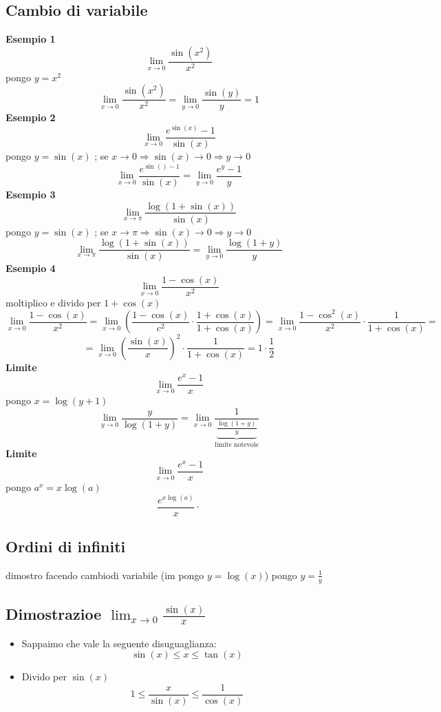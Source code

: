 \subsection{Cambio di variabile}
\textbf{Esempio 1} 
\[
\lim_{x \to 0} \frac{\sin\left( x^2 \right) }{x^2} 
\] 
pongo $y=x^2$ 
\[
\lim_{x \to 0} \frac{\sin\left( x^2 \right) }{x^2}= \lim_{y \to 0} \frac{\sin\left( y \right) }{y}= 1 
\] 
\textbf{Esempio 2}
\[
\lim_{x \to  0} \frac{e^{\sin\left( x \right) }-1}{\sin\left( x \right) } 
\] 
pongo $y=\sin\left( x \right) $ ; se $x \to 0 \Rightarrow \sin\left( x \right) \to 0 \Rightarrow y \to 0$ 
\[
\lim_{x \to 0} \frac{e^{\sin\left(  \right) -1}}{\sin\left( x \right) }= \lim_{y \to 0} \frac{e^{y}-1}{y}  
\] 
\textbf{Esempio 3}
\[
\lim_{x \to \pi } \frac{\log\left( 1+\sin\left( x \right)  \right) }{\sin\left( x \right) } 
\] 
pongo $y=\sin\left( x \right) $ ; se $x \to \pi \Rightarrow \sin\left( x \right) \to 0 \Rightarrow y \to 0$
\[
\lim_{x \to \pi } \frac{\log\left( 1+\sin\left( x \right)  \right) }{\sin\left( x \right) } = \lim_{y \to 0} \frac{\log \left( 1+y \right) }{y} 
\] 
\textbf{Esempio 4}
\[
\lim_{x \to 0} \frac{1-\cos\left( x \right) }{x^2} 
\]
moltiplico e divido per $1+\cos\left( x \right) $ 
\[
\lim_{x \to 0} \frac{1-\cos\left( x \right) }{x^2} = \lim_{x \to 0} \left(\frac{1-\cos\left( x \right) }{c^2} \cdot \frac{1+ \cos \left( x \right) }{1 + \cos \left( x \right) } \right) = \lim_{x \to 0} \frac{1-\cos ^2 \left( x \right) }{x^2} \cdot \frac{1}{1+\cos\left( x \right) }  = 
\]
\[
=\lim_{x \to 0} \left( \frac{\sin \left( x \right) }{x} \right) ^2 \cdot \frac{1}{1+\cos\left( x \right) } = 1 \cdot \frac{1}{2}
\]
\textbf{Limite}
\[
\lim_{x \to 0} \frac{e^{x} -1}{x}
\] 
pongo $ x = \log \left( y+1 \right) $ 
\[
 \lim_{y \to 0} \frac{y}{\log \left( 1+y \right) }  = \lim_{x \to 0} \frac{1}{\underbrace{\frac{\log\left( 1+ y\right) }{y}}_{\text{limite notevole}}} 
\] 
\textbf{Limite}
\[
\lim_{x \to 0} \frac{e^{x}-1}{x} 
\] 
pongo $a^{x}=x \log \left( a \right) $
\[
\frac{e^{x \log \left( a \right)  }}{x} \cdot  
\] 
\subsection{Ordini di infiniti}
\bigbox{
\[
\lim_{x \to \infty} \frac{\left( \log \left( x \right)  \right) ^{a}}{x^{b}}=0 \quad \forall e>0, b>0
\] 
}
dimostro facendo cambiodi variabile (im pongo $y= \log \left( x \right) $)
\bigbox{
\[
\lim_{x \to 0^{+}} x \log \left( x \right) = 0
\] 
}
pongo $y=\frac{1}{y}$

\subsection{Dimostrazioe $\lim_{x \to 0} \frac{\sin\left( x \right) }{x} $}
\begin{itemize}
	\item Sappaimo che vale la seguente disuguaglianza:
	\[
	\sin \left( x \right) \le x \le \tan \left( x \right) 
	\] 
	\item Divido per $\sin\left( x \right) $
	 \[
	 1 \le \frac{x}{\sin\left( x \right) }\le \frac{1}{\cos\left( x \right) }
	 \] 
\end{itemize}
